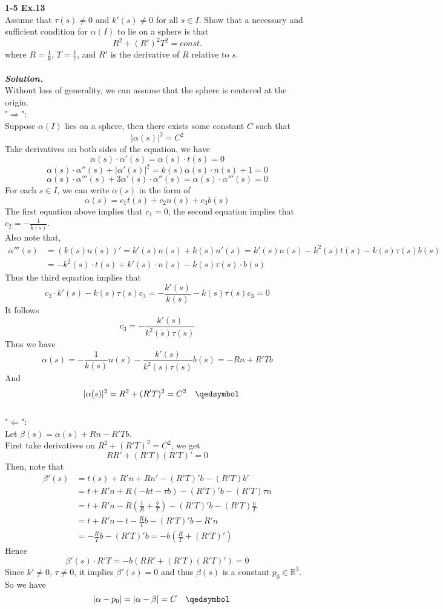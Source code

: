 \documentclass{article}
\begin{document}
\par
\textbf{1-5 Ex.13}\\
Assume that $\tau(s) \neq 0$ and $k'(s) \neq 0$ for all $s \in I$. Show that a necessary and sufficient
condition for $\alpha(I)$ to lie on a sphere is that
$$
    R^2 + (R')^2T^2 = const.
$$
where $R = \frac{1}{k}$, $T = \frac{1}{\tau}$, and $R'$ is the derivative of $R$ relative to $s$.
\\\\
\textbf{\textit{Solution.}}\\
Without loss of generality, we can assume that the sphere is centered at the origin.\\
"$\Rightarrow$":\\
Suppose $\alpha(I)$ lies on a sphere, then there exists some constant $C$ such that
$$
    |\alpha(s)|^2 = C^2
$$
Take derivatives on both sides of the equation, we have
$$
    \alpha(s) \cdot \alpha'(s) = \alpha(s) \cdot t(s) = 0
$$
$$
    \alpha(s) \cdot \alpha''(s) + |\alpha'(s)|^2 = k(s) \alpha(s) \cdot n(s) + 1 = 0
$$
$$
    \alpha(s) \cdot \alpha'''(s) + 3\alpha'(s) \cdot \alpha''(s) = \alpha(s) \cdot \alpha'''(s) = 0
$$
For each $s \in I$, we can write $\alpha(s)$ in the form of
$$
    \alpha(s) = c_1t(s) + c_2n(s) + c_3b(s)
$$
The first equation above implies that $c_1=0$, the second equation implies that $c_2 = -\frac{1}{k(s)}$.\\
Also note that,
$$
\begin{aligned}
    \alpha'''(s) &= (k(s)n(s))' = k'(s)n(s) + k(s)n'(s) = k'(s)n(s) - k^2(s)t(s) - k(s)\tau(s)b(s)\\
    &= -k^2(s) \cdot t(s) + k'(s) \cdot n(s) - k(s)\tau(s) \cdot b(s)
\end{aligned}
$$
Thus the third equation implies that
$$
    c_2 \cdot k'(s) - k(s)\tau(s)c_3 = -\frac{k'(s)}{k(s)} - k(s)\tau(s)c_3 = 0
$$
It follows
$$
    c_3 = -\frac{k'(s)}{k^2(s)\tau(s)}
$$
Thus we have
$$
    \alpha(s) = -\frac{1}{k(s)}n(s) - \frac{k'(s)}{k^2(s)\tau(s)}b(s) = -Rn + R'Tb
$$
And
$$
    \quad |\alpha(s)|^2 = R^2 + (R'T)^2 = C^2 \quad \qedsymbol
$$
\\
"$\Leftarrow$":\\
Let $\beta(s) = \alpha(s) + Rn - R'Tb$.\\
First take derivatives on $R^2 + (R'T)^2 = C^2$, we get
$$
    RR' + (R'T)(R'T)' = 0
$$
Then, note that
$$
\begin{aligned}
    \beta'(s) &= t(s) + R'n + Rn' - (R'T)'b - (R'T)b' \\
    &= t + R'n + R(-kt-\tau b) - (R'T)'b - (R'T)\tau n\\
    &= t + R'n - R(\frac{t}{R} + \frac{b}{T}) - (R'T)'b - (R'T)\frac{n}{T}\\
    &= t + R'n - t - \frac{R}{T}b - (R'T)'b - R'n\\
    &= -\frac{R}{T}b - (R'T)'b = -b(\frac{R}{T} + (R'T)')
\end{aligned}
$$
Hence
$$
    \beta'(s) \cdot R'T = -b(RR' + (R'T)(R'T)') = 0
$$
Since $k' \neq 0$, $\tau \neq 0$, it implies $\beta'(s) = 0$ and thus $\beta(s)$ is
a constant $p_0 \in \mathbb{R}^3$. So we have
$$
    \quad |\alpha - p_0| = |\alpha - \beta| = C \quad \qedsymbol
$$
\end{document}

